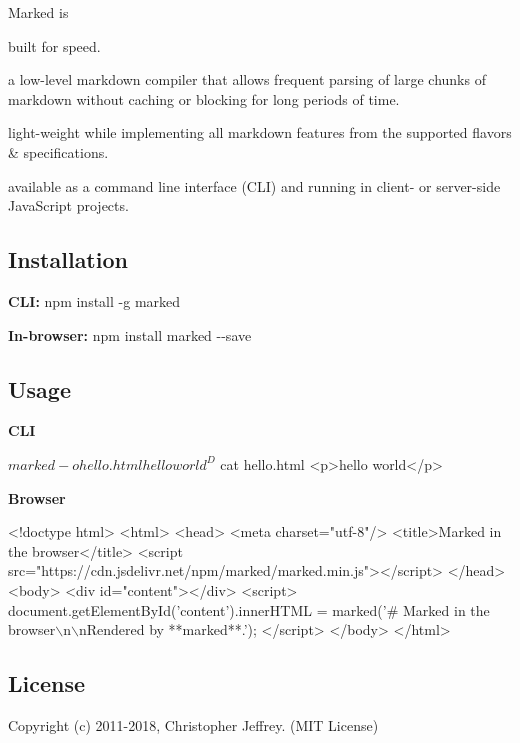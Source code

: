Marked is


\begin{DoxyEnumerate}
\item built for speed.
\item a low-\/level markdown compiler that allows frequent parsing of large chunks of markdown without caching or blocking for long periods of time.
\item light-\/weight while implementing all markdown features from the supported flavors \& specifications.
\item available as a command line interface (C\+LI) and running in client-\/ or server-\/side Java\+Script projects.
\end{DoxyEnumerate}

\subsection*{Installation}

{\bfseries C\+LI\+:} {\ttfamily npm install -\/g marked}

{\bfseries In-\/browser\+:} {\ttfamily npm install marked -\/-\/save}

\subsection*{Usage}

{\bfseries C\+LI}


\begin{DoxyCode}
$ marked -o hello.html
hello world
^D
$ cat hello.html
<p>hello world</p>
\end{DoxyCode}


{\bfseries Browser}


\begin{DoxyCode}
<!doctype html>
<html>
<head>
  <meta charset="utf-8"/>
  <title>Marked in the browser</title>
  <script src="https://cdn.jsdelivr.net/npm/marked/marked.min.js"></script>
</head>
<body>
  <div id="content"></div>
  <script>
    document.getElementById('content').innerHTML =
      marked('# Marked in the browser\(\backslash\)n\(\backslash\)nRendered by **marked**.');
  </script>
</body>
</html>
\end{DoxyCode}


\subsection*{License}

Copyright (c) 2011-\/2018, Christopher Jeffrey. (M\+IT License) 